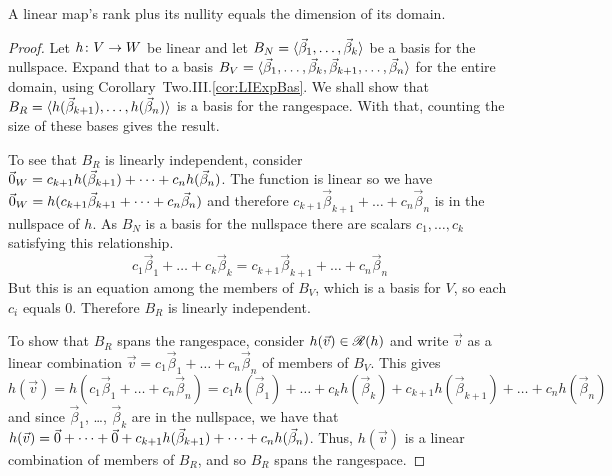 \begin{theorem}
\label{th:RankPlusNullEqDim}
A linear map's rank plus its nullity equals the dimension of its domain.
\end{theorem}

\begin{proof}
Let \( \mbox{$h\colon V\to W$} \) be linear and
let \( B_N=\langle\vec{\beta}_1,\ldots,\vec{\beta}_k\rangle \)
be a basis for the nullspace.
Expand that to a basis
\( B_V=\langle\vec{\beta}_1,\dots,\vec{\beta}_k,
       \vec{\beta}_{k+1},\dots,\vec{\beta}_n\rangle \)
for the entire domain, using Corollary~Two.III.\ref{cor:LIExpBas}.
We shall show that
\( B_R=\langle h(\vec{\beta}_{k+1}),\dots,h(\vec{\beta}_n)\rangle \)
is a basis for the rangespace.
With that, counting the size of these bases gives the result.

To see that \( B_R \) is linearly independent, 
consider 
\( \vec{0}_W=c_{k+1}h(\vec{\beta}_{k+1})+\dots+c_nh(\vec{\beta}_n) \).
The function is linear so we have
\( \vec{0}_W=h(c_{k+1}\vec{\beta}_{k+1}+\dots+c_n\vec{\beta}_n) \)
and therefore \( c_{k+1}\vec{\beta}_{k+1}+\dots+c_n\vec{\beta}_n \)
is in the nullspace of $h$.
As \( B_N\) is a basis for the nullspace there are scalars
\( c_1,\dots,c_k \) satisfying this relationship.
\begin{equation*}
   c_1\vec{\beta}_1+\dots+c_k\vec{\beta}_k
   =
   c_{k+1}\vec{\beta}_{k+1}+\dots+c_n\vec{\beta}_n
\end{equation*}
But this is an equation among the members of \( B_V \), 
which is a basis for \( V \), so each $c_i$ equals $0$.
Therefore \( B_R \) is linearly independent.

To show that \( B_R \) spans the rangespace,
consider \( h(\vec{v})\in \mathscr{R}(h) \) and
write \( \vec{v} \) as a linear combination 
$\vec{v}=c_1\vec{\beta}_1+\dots+c_n\vec{\beta}_n$
of members of \( B_V \).
This gives
$h(\vec{v})=h(c_1\vec{\beta}_1+\dots+c_n\vec{\beta}_n)
     =c_1h(\vec{\beta}_1)+\dots+c_kh(\vec{\beta}_k)
     +c_{k+1}h(\vec{\beta}_{k+1})+\dots+c_nh(\vec{\beta}_n)$
and since 
$\vec{\beta}_1$, \ldots, $\vec{\beta}_k$ are in the nullspace, we have
that 
$h(\vec{v})=\vec{0}+\dots+\vec{0}
     +c_{k+1}h(\vec{\beta}_{k+1})+\dots+c_nh(\vec{\beta}_n)$.
Thus, $h(\vec{v})$ is a linear combination of members of \( B_R \),
and so $B_R$ spans the rangespace.
\end{proof}

